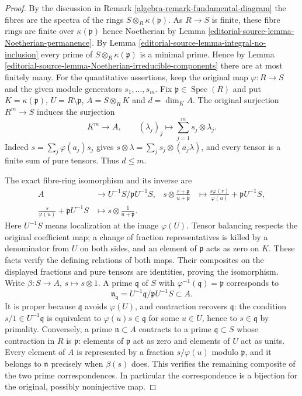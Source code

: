 \begin{proof}
By the discussion in
Remark \ref{algebra-remark-fundamental-diagram}
the fibres are the spectra of the rings $S \otimes_R \kappa(\mathfrak p)$.
As $R \to S$ is finite, these fibre rings are finite over
$\kappa(\mathfrak p)$ hence Noetherian by
Lemma \ref{editorial-source-lemma-Noetherian-permanence}.
By
Lemma \ref{editorial-source-lemma-integral-no-inclusion}
every prime of $S \otimes_R \kappa(\mathfrak p)$ is a minimal
prime. Hence by
Lemma \ref{editorial-source-lemma-Noetherian-irreducible-components}
there are at most finitely many.
\medskip\noindent
For the quantitative assertions, keep the original map
$\varphi:R\to S$ and the given module generators $s_1,\ldots,s_m$.
Fix $\mathfrak p\in\operatorname{Spec}(R)$ and put
$K=\kappa(\mathfrak p)$, $U=R\setminus\mathfrak p$,
$A=S\otimes_R K$ and $d=\dim_K A$.
The original surjection $R^m\to S$ induces the surjection
$$
K^m\longrightarrow A,\qquad
(\lambda_j)_j\longmapsto\sum_{j=1}^m s_j\otimes\lambda_j.
$$
Indeed $s=\sum_j\varphi(a_j)s_j$ gives
$s\otimes\lambda=\sum_j s_j\otimes(\overline{a_j}\lambda)$,
and every tensor is a finite sum of pure tensors. Thus $d\leq m$.

The exact fibre-ring isomorphism and its inverse are
$$
\begin{aligned}
A&\longrightarrow U^{-1}S/\mathfrak pU^{-1}S,&
s\otimes\frac{r+\mathfrak p}{u+\mathfrak p}
&\longmapsto\frac{s\varphi(r)}{\varphi(u)}+\mathfrak pU^{-1}S,\\
\frac{s}{\varphi(u)}+\mathfrak pU^{-1}S
&\longmapsto s\otimes\frac1{u+\mathfrak p}.&&
\end{aligned}
$$
Here $U^{-1}S$ means localization at the image $\varphi(U)$.
Tensor balancing respects the original coefficient map; a change
of fraction representatives is killed by a denominator from $U$
on both sides, and an element of $\mathfrak p$ acts as zero on
$K$. These facts verify the defining relations of both maps.
Their composites on the displayed fractions and pure tensors
are identities, proving the isomorphism.
Write $\beta:S\to A$, $s\mapsto s\otimes1$.
A prime $\mathfrak q$ of $S$ with
$\varphi^{-1}(\mathfrak q)=\mathfrak p$ corresponds to
$$
\mathfrak n_{\mathfrak q}
=U^{-1}\mathfrak q/\mathfrak pU^{-1}S\subset A.
$$
It is proper because $\mathfrak q$ avoids $\varphi(U)$, and
contraction recovers $\mathfrak q$: the condition
$s/1\in U^{-1}\mathfrak q$ is equivalent to
$\varphi(u)s\in\mathfrak q$ for some $u\in U$, hence to
$s\in\mathfrak q$ by primality. Conversely, a prime
$\mathfrak n\subset A$ contracts to a prime $\mathfrak q\subset S$
whose contraction in $R$ is $\mathfrak p$: elements of
$\mathfrak p$ act as zero and elements of $U$ act as units.
Every element of $A$ is represented by a fraction $s/\varphi(u)$
modulo $\mathfrak p$, and it belongs to $\mathfrak n$ precisely
when $\beta(s)$ does. This verifies the remaining composite of
the two prime correspondences. In particular the correspondence
is a bijection for the original, possibly noninjective map.


\end{proof}
